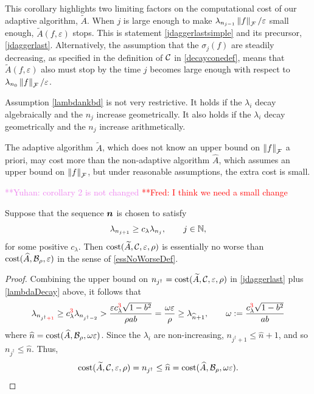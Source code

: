 \documentclass[graybox,footinfo]{svmult}
\newcommand{\DHJRnorm}[2][{}]{\ensuremath{\left \lVert #2 \right \rVert}_{#1}}
\newcommand{\frednote}[1]{  {\textcolor{red}  {\mbox{**Fred:} #1}}}
\newcommand{\yuhannote}[1]{ {\textcolor{violet}  {\mbox{**Yuhan:} #1}}}
\begin{document}
This corollary highlights two limiting factors on the computational cost of our adaptive algorithm, $\widetilde{A}$. When $j$ is large enough to make $\lambda_{n_{j-1}}\DHJRnorm[\calF]{f}/\varepsilon$ small enough, $\widetilde{A}(f,\varepsilon)$ stops.  This is statement \eqref{jdaggerlastsimple} 
and its precursor, \eqref{jdaggerlast}.  Alternatively, the assumption that the $\sigma_j(f)$ are steadily decreasing, as specified in the definition of ${\mathcal{C}}$ in \eqref{decayconedef}, means that $\widetilde{A}(f,\varepsilon)$ also must stop by the time $j$ becomes large enough with respect to $\lambda_{n_0}\DHJRnorm[\calF]{f}/\varepsilon$.

Assumption \eqref{lambdankbd} is not very restrictive.  It holds if the $\lambda_i$ decay algebraically and the $n_j$ increase geometrically.  It also holds if the $\lambda_i$ decay geometrically and the $n_j$ increase arithmetically.

The adaptive algorithm $\widetilde{A}$, which does not know an upper bound on $\DHJRnorm[\calF]{f}$ a priori, may cost more than the non-adaptive algorithm $\widehat{A}$, which assumes an upper bound on $\DHJRnorm[\calF]{f}$, but under reasonable assumptions, the extra cost is small.

\yuhannote{corollary 2 is not changed} \frednote{I think we need a small change}
\begin{corollary} \label{cor:tAsameCosthA} Suppose that the sequence ${\boldsymbol{n}}$ is chosen to satisfy
\begin{equation} \label{lambdaDecay}
\lambda_{n_{j+1}} \ge c_\lambda \lambda_{n_j}, \qquad j \in \bbN, 
\end{equation}
for some positive $c_\lambda$.  Then $\textup{cost}(\widetilde{A},{\mathcal{C}}, \varepsilon,\rho)$ is essentially no worse than \linebreak[4]
$\textup{cost}(\widehat{A},{\mathcal{B}}_{\rho},\varepsilon)$ in the sense of \eqref{essNoWorseDef}. 
\end{corollary}

\begin{proof}
Combining the upper bound on $n_{j^\dagger} = \textup{cost}(\widetilde{A},{\mathcal{C}},\varepsilon,\rho)$ in \eqref{jdaggerlast} plus  \eqref{lambdaDecay} above, it follows that
\begin{equation*}
\lambda_{n_{j^\dagger{{\color{red}+1}}}} \ge c_{\lambda}^{{\color{red}{3}}} \lambda_{n_{j^\dagger-2}} > \frac{\varepsilon c_{\lambda}^{{\color{red}{3}}}\sqrt{1 - b^2}}{\rho ab } = \frac{\omega \varepsilon}{\rho} \ge \lambda_{\widehat{n}+1},
\qquad \omega := \frac{ c_{\lambda}^{{\color{red}{3}}}\sqrt{1 - b^2}}{ab }
\end{equation*}
where $\widehat{n}
= \textup{cost}(\widehat{A},{\mathcal{B}}_{\rho},\omega\varepsilon )$.
Since the $\lambda_i$ are non-increasing, {\color{red} $n_{j^\dagger+1} \le \widehat{n}+1$, and so $n_{j^\dagger} \le \widehat{n}$.  Thus, }
\begin{equation*}
\textup{cost}(\widetilde{A},{\mathcal{C}},\varepsilon,\rho) = n_{j^\dagger} \le \widehat{n} = \textup{cost}(\widehat{A},{\mathcal{B}}_{\rho}, \omega \varepsilon).
\end{equation*}
\end{proof}
\end{document}
